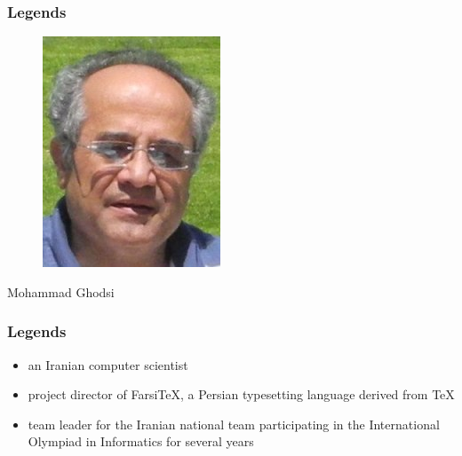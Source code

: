 \documentclass{../c-lecture}
\begin{document}
\begin{frame}
  \frametitle{Legends}
  \begin{figure}
    \includegraphics[height=.75\textheight]{./img/ghodsi.jpg}
  \end{figure}
  \pause%
  \centering
  \color{Violet} Mohammad Ghodsi
\end{frame}

\begin{frame}
  \frametitle{Legends}
  \begin{itemize}
    \item an Iranian computer scientist
    \item project director of FarsiTeX, a Persian typesetting language derived from TeX
    \item team leader for the Iranian national team participating in the International Olympiad in Informatics for several years
  \end{itemize}
\end{frame}
\end{document}
